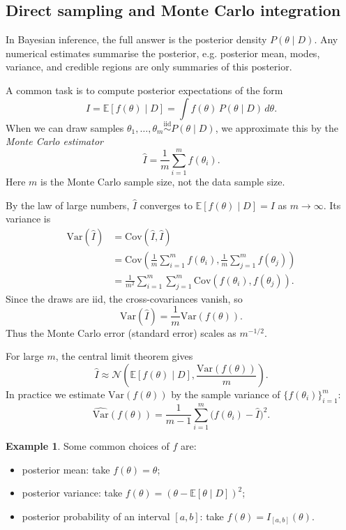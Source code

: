 \documentclass[11pt, titlepage]{article} %
\numberwithin{equation}{section}
\theoremstyle{definition}
\newtheorem*{example*}{Example}
\numberwithin{assumption}{section}
\begin{document}
\subsection{Direct sampling and Monte Carlo integration}

In Bayesian inference, the full answer is the posterior density $P(\theta\mid D)$. Any numerical estimates summarise the posterior, e.g. posterior mean, modes, variance, and credible regions are only summaries of this posterior.

A common task is to compute posterior expectations of the form
\begin{equation*}
    I=\mathbb{E}[f(\theta)\mid D]=\int f(\theta)\,P(\theta\mid D)\,d\theta.
\end{equation*}
When we can draw samples $\theta_1,\dots,\theta_m \overset{\mathrm{iid}}{\sim} P(\theta\mid D)$, we approximate this by the \textit{Monte Carlo estimator}
\begin{equation*}
    \hat I=\frac{1}{m}\sum_{i=1}^m f(\theta_i).
\end{equation*}
Here $m$ is the Monte Carlo sample size, not the data sample size.

By the law of large numbers, $\hat I$ converges to $\mathbb{E}[f(\theta)\mid D]=I$ as $m\to\infty$. Its variance is
\begin{align*}
    \mathrm{Var}(\hat I)
    &= \mathrm{Cov}(\hat I,\hat I)\\
    &= \mathrm{Cov}\!\left(\frac{1}{m}\sum_{i=1}^m f(\theta_i),\frac{1}{m}\sum_{j=1}^m f(\theta_j)\right)\\
    &= \frac{1}{m^2}\sum_{i=1}^m\sum_{j=1}^m \mathrm{Cov}(f(\theta_i),f(\theta_j)).
\end{align*}
Since the draws are iid, the cross-covariances vanish, so
\begin{equation*}
    \mathrm{Var}(\hat I)=\frac{1}{m}\mathrm{Var}(f(\theta)).
\end{equation*}
Thus the Monte Carlo error (standard error) scales as $m^{-1/2}$.

For large $m$, the central limit theorem gives
\begin{equation*}
    \hat I \approx \mathcal{N}\!\left(\mathbb{E}[f(\theta)\mid D],\frac{\mathrm{Var}(f(\theta))}{m}\right).
\end{equation*}
In practice we estimate $\mathrm{Var}(f(\theta))$ by the sample variance of $\{f(\theta_i)\}_{i=1}^m$:
\begin{equation*}
    \widehat{\mathrm{Var}}(f(\theta))
    =
    \frac{1}{m-1}\sum_{i=1}^m \bigl(f(\theta_i)-\hat I\bigr)^2.
\end{equation*}
\begin{example*} Some common choices of $f$ are:

    \begin{itemize}
    \item posterior mean: take $f(\theta)=\theta$;
    \item posterior variance: take $f(\theta)=(\theta-\mathbb{E}[\theta\mid D])^2$;
    \item posterior probability of an interval $[a,b]$: take $f(\theta)=I_{[a,b]}(\theta)$.
\end{itemize}
\end{example*}
\end{document}
